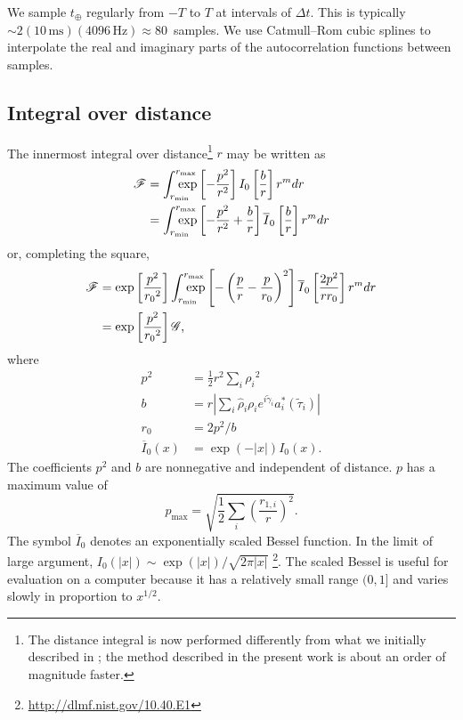 \documentclass[amsmath,amssymb,aps,prx,reprint,nopreprintnumbers,nofootinbib]{revtex4-1}
\def\mathrlap{\mathpalette\mathrlapinternal}
\def\mathrlapinternal#1#2{\rlap{$\mathsurround=0pt#1{#2}$}}
\begin{document}
We sample $t_\oplus$ regularly from $-T$ to $T$ at intervals of $\Delta t$. This is typically $\sim 2 (10\,\mathrm{ms})(4096\,\mathrm{Hz}) \approx 80$~samples. We use Catmull\nobreakdashes--Rom cubic splines to interpolate the real and imaginary parts of the autocorrelation functions between samples.

\subsection{Integral over distance}

The innermost integral over distance\footnote{The distance integral is now performed differently from what we initially described in \cite{leo-singer-thesis}; the method described in the present work is about an order of magnitude faster.} $r$ may be written as
%
\begin{align}\label{eq:distance-integral}
    \mathscr{F} &=
        \int_{\mathrlap{r_\mathrm{min}}}^{\mathrlap{r_\mathrm{max}}}
        \exp\left[-\frac{p^2}{r^2}\right]
        I_0\left[\frac{b}{r}\right] r^m dr \nonumber \\
    &=
        \int_{\mathrlap{r_\mathrm{min}}}^{\mathrlap{r_\mathrm{max}}}
        \exp\left[-\frac{p^2}{r^2}+\frac{b}{r}\right]
        \overline{I}_0\left[\frac{b}{r}\right] r^m dr
\end{align}
%
or, completing the square,
%
\begin{align}
    \mathscr{F} &= \exp\left[\frac{p^2}{{r_0}^2}\right]
        \int_{\mathrlap{r_\mathrm{min}}}^{\mathrlap{r_\mathrm{max}}}
        \exp\left[-\left(\frac{p}{r} - \frac{p}{r_0}\right)^2\right]
        \overline{I}_0\left[\frac{2p^2}{r r_0}\right] r^m dr \\
    &= \exp\left[\frac{p^2}{{r_0}^2}\right] \mathscr{G},
\end{align}
%
where
%
\begin{align}
    p^2 &= \frac{1}{2} r^2 \sum_i {\rho_i}^2 \label{eq:likelihood-p-factor} \\
    b &= r \left| \sum_i \hat\rho_i \rho_i e^{i \tilde{\gamma}_i}
        a_i^*(\tilde{\tau}_i) \right| \label{eq:likelihood-b-factor} \\
    r_0 &= 2 p^2 / b \\
    \overline{I}_0(x) &= \exp(-|x|) I_0(x).
\end{align}
%
The coefficients $p^2$ and $b$ are nonnegative and independent of distance. $p$ has a maximum value of
%
\begin{equation}
    p_\mathrm{max} = \sqrt{\frac{1}{2} \sum_i \left(\frac{r_{1,i}}{r}\right)^2}.
\end{equation}
%
The symbol $\overline{I}_0$ denotes an exponentially scaled Bessel function. In the limit of large argument, $I_0(|x|) \sim \exp(|x|) / \sqrt{2 \pi |x|}$ \citep{Olver:2010:NHMF,NIST:DLMF}\footnote{\url{http://dlmf.nist.gov/10.40.E1}}. The scaled Bessel is useful for evaluation on a computer because it has a relatively small range $(0, 1]$ and varies slowly in proportion to $x^{1/2}$.
\end{document}

